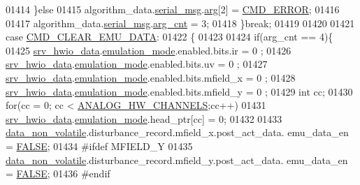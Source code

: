\begin{DoxyCode}
{{{{{01414                         \}\textcolor{keywordflow}{else}
01415                              algorithm\_data.\hyperlink{a00016_afcf5f557aea688aad985eec15269c1da}{serial\_msg}.\hyperlink{a00031_af7d6f762438c80072bd9dc0e4dd4ae1e}{arg}[2] = 
      \hyperlink{a00021_a1764a522e9c1a59a59be8757c69fa494}{CMD\_ERROR};
01416 
01417                              algorithm\_data.\hyperlink{a00016_afcf5f557aea688aad985eec15269c1da}{serial\_msg}.\hyperlink{a00031_a7b79f40e2eeec288091afd340bf8f591}{arg\_cnt} = 3;
01418                 \}\textcolor{keywordflow}{break};
01419 
01420 
01421                 \textcolor{keywordflow}{case}  \hyperlink{a00021_aa5f71f685588bc4e978cd6d595a5ea81}{CMD\_CLEAR\_EMU\_DATA}:
01422                 \{
01423 
01424                           \textcolor{keywordflow}{if}(arg\_cnt == 4)\{
01425                           \hyperlink{a00034_a0fd91014631926f362c7c2b2f5d143b0}{srv\_hwio\_data}.\hyperlink{a00034_a742dceaef1f19ec73ed5acc066127476}{emulation\_mode}.enabled.bits.ir       = 0
      ;
01426                           \hyperlink{a00034_a0fd91014631926f362c7c2b2f5d143b0}{srv\_hwio\_data}.\hyperlink{a00034_a742dceaef1f19ec73ed5acc066127476}{emulation\_mode}.enabled.bits.uv       = 0
      ;
01427                           \hyperlink{a00034_a0fd91014631926f362c7c2b2f5d143b0}{srv\_hwio\_data}.\hyperlink{a00034_a742dceaef1f19ec73ed5acc066127476}{emulation\_mode}.enabled.bits.mfield\_x = 0
      ;
01428                           \hyperlink{a00034_a0fd91014631926f362c7c2b2f5d143b0}{srv\_hwio\_data}.\hyperlink{a00034_a742dceaef1f19ec73ed5acc066127476}{emulation\_mode}.enabled.bits.mfield\_y = 0
      ;
01429                           \textcolor{keywordtype}{int} cc;
01430                           \textcolor{keywordflow}{for}(cc = 0; cc < \hyperlink{a00034_ab6ea71f43c4869429695d697be882efe}{ANALOG\_HW\_CHANNELS};cc++)
01431                           \hyperlink{a00034_a0fd91014631926f362c7c2b2f5d143b0}{srv\_hwio\_data}.\hyperlink{a00034_a742dceaef1f19ec73ed5acc066127476}{emulation\_mode}.head\_ptr[cc] = 0;
01432 
01433                           \hyperlink{a00060_a76ac5f917f5308dcd83de0d7c94559fb}{data\_non\_volatile}.disturbance\_record.mfield\_x.post\_act\_data.
      emu\_data\_en = \hyperlink{a00040_aa93f0eb578d23995850d61f7d61c55c1}{FALSE};
01434                           #ifdef MFIELD\_Y
01435                           \hyperlink{a00060_a76ac5f917f5308dcd83de0d7c94559fb}{data\_non\_volatile}.disturbance\_record.mfield\_y.post\_act\_data.
      emu\_data\_en = \hyperlink{a00040_aa93f0eb578d23995850d61f7d61c55c1}{FALSE};
01436                           #endif
}}}}}
\end{DoxyCode}
